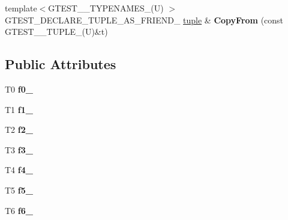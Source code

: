 \begin{DoxyCompactItemize}
\item 
{\footnotesize template$<$G\+T\+E\+S\+T\+\_\+\_\+\+T\+Y\+P\+E\+N\+A\+M\+E\+S\+\_\+(\+U) $>$ }\\G\+T\+E\+S\+T\+\_\+\+D\+E\+C\+L\+A\+R\+E\+\_\+\+T\+U\+P\+L\+E\+\_\+\+A\+S\+\_\+\+F\+R\+I\+E\+N\+D\+\_\+ \hyperlink{classstd_1_1tr1_1_1tuple}{tuple} \& {\bfseries Copy\+From} (const G\+T\+E\+S\+T\+\_\+\_\+\+T\+U\+P\+L\+E\+\_\+(U)\&t)\hypertarget{classstd_1_1tr1_1_1tuple_a3d06fb121d18b6e1c10d14f9e966618d}{}\label{classstd_1_1tr1_1_1tuple_a3d06fb121d18b6e1c10d14f9e966618d}

\end{DoxyCompactItemize}
\subsection*{Public Attributes}
\begin{DoxyCompactItemize}
\item 
T0 {\bfseries f0\+\_\+}\hypertarget{classstd_1_1tr1_1_1tuple_a771b1d99e8800fb284acd04bca838cbb}{}\label{classstd_1_1tr1_1_1tuple_a771b1d99e8800fb284acd04bca838cbb}

\item 
T1 {\bfseries f1\+\_\+}\hypertarget{classstd_1_1tr1_1_1tuple_a7cccf899dedc626c51fa4f6921d0ac52}{}\label{classstd_1_1tr1_1_1tuple_a7cccf899dedc626c51fa4f6921d0ac52}

\item 
T2 {\bfseries f2\+\_\+}\hypertarget{classstd_1_1tr1_1_1tuple_aaec06c27366502dc332ef96878628f84}{}\label{classstd_1_1tr1_1_1tuple_aaec06c27366502dc332ef96878628f84}

\item 
T3 {\bfseries f3\+\_\+}\hypertarget{classstd_1_1tr1_1_1tuple_ad4d3673e0d5c07c392c02e335fe978ff}{}\label{classstd_1_1tr1_1_1tuple_ad4d3673e0d5c07c392c02e335fe978ff}

\item 
T4 {\bfseries f4\+\_\+}\hypertarget{classstd_1_1tr1_1_1tuple_ab662f1051c2302d065796383848db6c4}{}\label{classstd_1_1tr1_1_1tuple_ab662f1051c2302d065796383848db6c4}

\item 
T5 {\bfseries f5\+\_\+}\hypertarget{classstd_1_1tr1_1_1tuple_a32d8cd6f180c0a77d83733fc65423657}{}\label{classstd_1_1tr1_1_1tuple_a32d8cd6f180c0a77d83733fc65423657}

\item 
T6 {\bfseries f6\+\_\+}\hypertarget{classstd_1_1tr1_1_1tuple_a597beab3af3f95c84408491ab14632b0}{}\label{classstd_1_1tr1_1_1tuple_a597beab3af3f95c84408491ab14632b0}


\end{DoxyCompactItemize}
